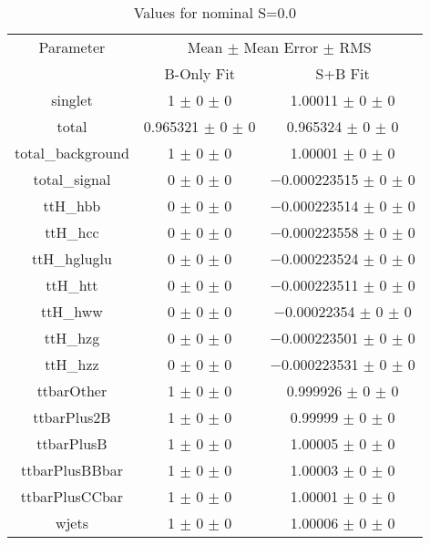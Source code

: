 \begin{table}
\centering
\caption{Values for nominal S=0.0}
\begin{tabular}{ccc}
\toprule
Parameter 	& \multicolumn{2}{c}{Mean $\pm$ Mean Error $\pm$ RMS}\\
 	& B-Only Fit & S+B Fit\\
\midrule
singlet 	& \num{1} $\pm$ \num{0} $\pm$ \num{0} 	& \num{1.00011} $\pm$ \num{0} $\pm$ \num{0}\\
total 	& \num{0.965321} $\pm$ \num{0} $\pm$ \num{0} 	& \num{0.965324} $\pm$ \num{0} $\pm$ \num{0}\\
total\_background 	& \num{1} $\pm$ \num{0} $\pm$ \num{0} 	& \num{1.00001} $\pm$ \num{0} $\pm$ \num{0}\\
total\_signal 	& \num{0} $\pm$ \num{0} $\pm$ \num{0} 	& \num{-0.000223515} $\pm$ \num{0} $\pm$ \num{0}\\
ttH\_hbb 	& \num{0} $\pm$ \num{0} $\pm$ \num{0} 	& \num{-0.000223514} $\pm$ \num{0} $\pm$ \num{0}\\
ttH\_hcc 	& \num{0} $\pm$ \num{0} $\pm$ \num{0} 	& \num{-0.000223558} $\pm$ \num{0} $\pm$ \num{0}\\
ttH\_hgluglu 	& \num{0} $\pm$ \num{0} $\pm$ \num{0} 	& \num{-0.000223524} $\pm$ \num{0} $\pm$ \num{0}\\
ttH\_htt 	& \num{0} $\pm$ \num{0} $\pm$ \num{0} 	& \num{-0.000223511} $\pm$ \num{0} $\pm$ \num{0}\\
ttH\_hww 	& \num{0} $\pm$ \num{0} $\pm$ \num{0} 	& \num{-0.00022354} $\pm$ \num{0} $\pm$ \num{0}\\
ttH\_hzg 	& \num{0} $\pm$ \num{0} $\pm$ \num{0} 	& \num{-0.000223501} $\pm$ \num{0} $\pm$ \num{0}\\
ttH\_hzz 	& \num{0} $\pm$ \num{0} $\pm$ \num{0} 	& \num{-0.000223531} $\pm$ \num{0} $\pm$ \num{0}\\
ttbarOther 	& \num{1} $\pm$ \num{0} $\pm$ \num{0} 	& \num{0.999926} $\pm$ \num{0} $\pm$ \num{0}\\
ttbarPlus2B 	& \num{1} $\pm$ \num{0} $\pm$ \num{0} 	& \num{0.99999} $\pm$ \num{0} $\pm$ \num{0}\\
ttbarPlusB 	& \num{1} $\pm$ \num{0} $\pm$ \num{0} 	& \num{1.00005} $\pm$ \num{0} $\pm$ \num{0}\\
ttbarPlusBBbar 	& \num{1} $\pm$ \num{0} $\pm$ \num{0} 	& \num{1.00003} $\pm$ \num{0} $\pm$ \num{0}\\
ttbarPlusCCbar 	& \num{1} $\pm$ \num{0} $\pm$ \num{0} 	& \num{1.00001} $\pm$ \num{0} $\pm$ \num{0}\\
wjets 	& \num{1} $\pm$ \num{0} $\pm$ \num{0} 	& \num{1.00006} $\pm$ \num{0} $\pm$ \num{0}\\
\bottomrule
\end{tabular}
\end{table}